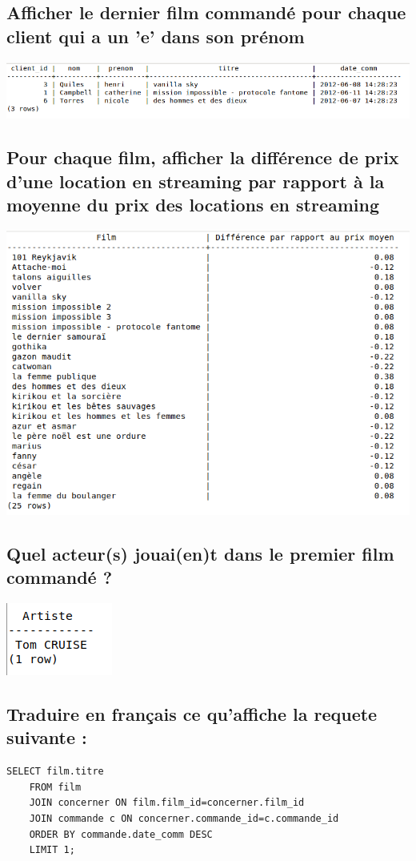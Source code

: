 \documentclass[]{scrartcl}
\begin{document}
\subsection{Afficher le dernier film commandé pour chaque client qui a un 'e' dans son prénom}
	\includegraphics[scale=.5]{8}

\subsection{Pour chaque film, afficher la différence de prix d'une location en streaming par rapport à la moyenne du prix des locations en streaming}
	\includegraphics[scale=.5]{9}

\subsection{Quel acteur(s) jouai(en)t dans le premier film commandé ?}
	\includegraphics[scale=.5]{10}

\subsection{Traduire en français ce qu'affiche la requete suivante :}
  

\begin{lstlisting}[frame=single]  
	SELECT film.titre
	FROM film
	JOIN concerner ON film.film_id=concerner.film_id
	JOIN commande c ON concerner.commande_id=c.commande_id
	ORDER BY commande.date_comm DESC
	LIMIT 1;
\end{lstlisting}
\end{document}
